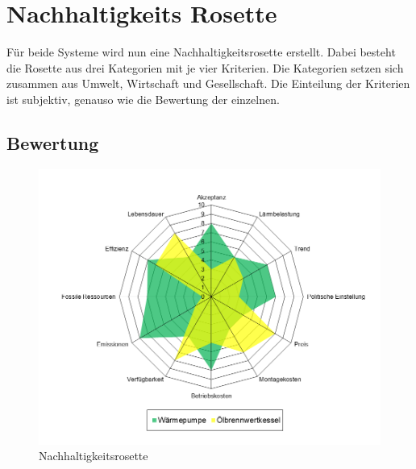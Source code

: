 \chapter{Nachhaltigkeits Rosette}
\label{chap:rosette}

Für beide Systeme wird nun eine Nachhaltigkeitsrosette erstellt. Dabei besteht die Rosette aus drei Kategorien mit je vier Kriterien. Die Kategorien setzen sich zusammen aus Umwelt, Wirtschaft und Gesellschaft. Die Einteilung der Kriterien ist subjektiv, genauso wie die Bewertung der einzelnen.



\section{Bewertung}

\begin{figure}[h]
\includegraphics[scale=0.54]{bilder/Rosette.png}
\caption{Nachhaltigkeitsrosette}
\end{figure}

